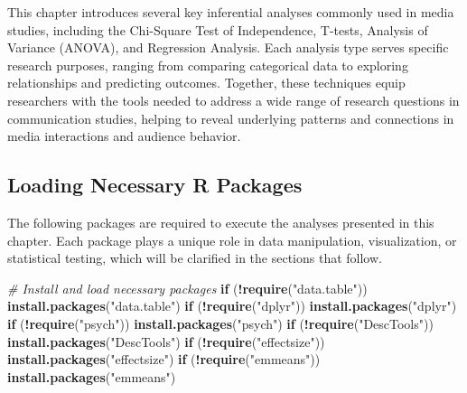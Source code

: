 \documentclass[
]{book}
\newenvironment{Shaded}{\begin{snugshade}}{\end{snugshade}}
\newcommand{\CommentTok}[1]{\textcolor[rgb]{0.56,0.35,0.01}{\textit{#1}}}
\newcommand{\ControlFlowTok}[1]{\textcolor[rgb]{0.13,0.29,0.53}{\textbf{#1}}}
\newcommand{\FunctionTok}[1]{\textcolor[rgb]{0.13,0.29,0.53}{\textbf{#1}}}
\newcommand{\NormalTok}[1]{#1}
\newcommand{\SpecialCharTok}[1]{\textcolor[rgb]{0.81,0.36,0.00}{\textbf{#1}}}
\newcommand{\StringTok}[1]{\textcolor[rgb]{0.31,0.60,0.02}{#1}}
\begin{document}
This chapter introduces several key inferential analyses commonly used in media studies, including the Chi-Square Test of Independence, T-tests, Analysis of Variance (ANOVA), and Regression Analysis. Each analysis type serves specific research purposes, ranging from comparing categorical data to exploring relationships and predicting outcomes. Together, these techniques equip researchers with the tools needed to address a wide range of research questions in communication studies, helping to reveal underlying patterns and connections in media interactions and audience behavior.

\subsection*{Loading Necessary R Packages}\label{loading-necessary-r-packages}

The following packages are required to execute the analyses presented in this chapter. Each package plays a unique role in data manipulation, visualization, or statistical testing, which will be clarified in the sections that follow.

\begin{Shaded}
\begin{Highlighting}[]
\CommentTok{\# Install and load necessary packages}
\ControlFlowTok{if}\NormalTok{ (}\SpecialCharTok{!}\FunctionTok{require}\NormalTok{(}\StringTok{"data.table"}\NormalTok{)) }\FunctionTok{install.packages}\NormalTok{(}\StringTok{"data.table"}\NormalTok{)}
\ControlFlowTok{if}\NormalTok{ (}\SpecialCharTok{!}\FunctionTok{require}\NormalTok{(}\StringTok{"dplyr"}\NormalTok{)) }\FunctionTok{install.packages}\NormalTok{(}\StringTok{"dplyr"}\NormalTok{)}
\ControlFlowTok{if}\NormalTok{ (}\SpecialCharTok{!}\FunctionTok{require}\NormalTok{(}\StringTok{"psych"}\NormalTok{)) }\FunctionTok{install.packages}\NormalTok{(}\StringTok{"psych"}\NormalTok{)}
\ControlFlowTok{if}\NormalTok{ (}\SpecialCharTok{!}\FunctionTok{require}\NormalTok{(}\StringTok{"DescTools"}\NormalTok{)) }\FunctionTok{install.packages}\NormalTok{(}\StringTok{"DescTools"}\NormalTok{)}
\ControlFlowTok{if}\NormalTok{ (}\SpecialCharTok{!}\FunctionTok{require}\NormalTok{(}\StringTok{"effectsize"}\NormalTok{)) }\FunctionTok{install.packages}\NormalTok{(}\StringTok{"effectsize"}\NormalTok{)}
\ControlFlowTok{if}\NormalTok{ (}\SpecialCharTok{!}\FunctionTok{require}\NormalTok{(}\StringTok{"emmeans"}\NormalTok{)) }\FunctionTok{install.packages}\NormalTok{(}\StringTok{"emmeans"}\NormalTok{)}
\end{Highlighting}
\end{Shaded}
\end{document}
